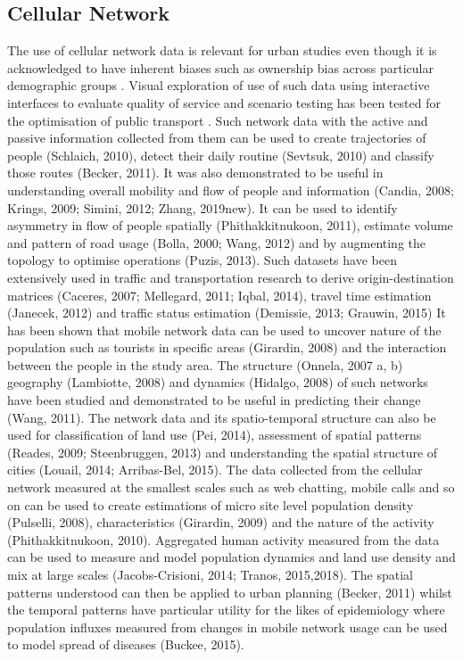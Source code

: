 \subsection{Cellular Network}

The use of cellular network data is relevant for urban studies \citep{jiang2013,steenbruggen2015, lokanathan2015, calabrese2015, reades2007} even though it is acknowledged to have inherent biases such as ownership bias across particular demographic groups \citep{wesolowski2013}.
Visual exploration of use of such data using interactive interfaces to evaluate quality of service and scenario testing has been tested for the optimisation of public transport \cite{sbodio2014}.
Such network data with the active and passive information collected from them can be used to create trajectories of people (Schlaich, 2010), detect their daily routine (Sevtsuk, 2010) and classify those routes (Becker, 2011).
It was also demonstrated to be useful in understanding overall mobility and flow of people and information (Candia, 2008; Krings, 2009; Simini, 2012; Zhang, 2019new).
It can be used to identify asymmetry in flow of people spatially (Phithakkitnukoon, 2011), estimate volume and pattern of road usage (Bolla, 2000; Wang, 2012) and by augmenting the topology to optimise operations (Puzis, 2013).
Such datasets have been extensively used in traffic and transportation research to derive origin-destination matrices (Caceres, 2007; Mellegard, 2011; Iqbal, 2014), travel time estimation (Janecek, 2012) and traffic status estimation (Demissie, 2013; Grauwin, 2015)        
It has been shown that mobile network data can be used to uncover nature of the population such as tourists in specific areas (Girardin, 2008) and the interaction between the people in the study area.
The structure (Onnela, 2007 a, b) geography (Lambiotte, 2008) and dynamics (Hidalgo, 2008) of such networks have been studied and demonstrated to be useful in predicting their change (Wang, 2011).
The network data and its spatio-temporal structure can also be used for classification of land use (Pei, 2014), assessment of spatial patterns (Reades, 2009; Steenbruggen, 2013) and understanding the spatial structure of cities (Louail, 2014; Arribas-Bel, 2015).
The data collected from the cellular network measured at the smallest scales such as web chatting, mobile calls and so on can be used to create estimations of micro site level population density (Pulselli, 2008), characteristics (Girardin, 2009) and the nature of the activity (Phithakkitnukoon, 2010).
Aggregated human activity measured from the data can be used to measure and model population dynamics and land use density and mix at large scales (Jacobs-Crisioni, 2014; Tranos, 2015,2018).
The spatial patterns understood can then be applied to urban planning (Becker, 2011) whilst the temporal patterns have particular utility for the likes of epidemiology where population influxes measured from changes in mobile network usage can be used to model spread of diseases (Buckee, 2015).

